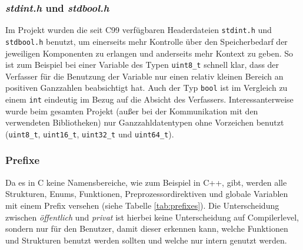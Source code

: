 \documentclass[oneside]{ausarbeitung}
\begin{document}
\subsubsection{\textit{stdint.h} und \textit{stdbool.h}}
Im Projekt wurden die seit C99 verfügbaren Headerdateien \texttt{stdint.h} und \texttt{stdbool.h} benutzt, um einerseits mehr Kontrolle über den Speicherbedarf der jeweiligen Komponenten zu erlangen und anderseits mehr Kontext zu geben. So ist zum Beispiel bei einer Variable des Typen \texttt{uint8\_t} schnell klar, dass der Verfasser für die Benutzung der Variable nur einen relativ kleinen Bereich an positiven Ganzzahlen beabsichtigt hat. Auch der Typ \texttt{bool} ist im Vergleich zu einem \texttt{int} eindeutig im Bezug auf die Absicht des Verfassers. Interessanterweise wurde beim gesamten Projekt (außer bei der Kommunikation mit den verwendeten Bibliotheken) nur Ganzzahldatentypen ohne Vorzeichen benutzt (\texttt{uint8\_t}, \texttt{uint16\_t}, \texttt{uint32\_t} und \texttt{uint64\_t}).

\subsubsection{Prefixe}
Da es in C keine Namensbereiche, wie zum Beispiel in C++, gibt, werden alle Strukturen, Enums, Funktionen, Preprozessordirektiven und globale Variablen mit einem Prefix versehen (siehe Tabelle \ref{tab:prefixes}). Die Unterscheidung zwischen \textit{öffentlich} und \textit{privat} ist hierbei keine Unterscheidung auf Compilerlevel, sondern nur für den Benutzer, damit dieser erkennen kann, welche Funktionen und Strukturen benutzt werden sollten und welche nur intern genutzt werden.
\end{document}
